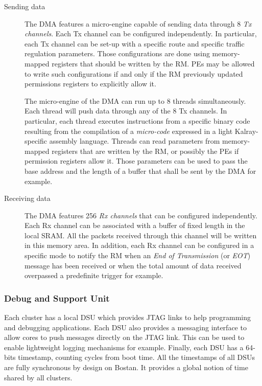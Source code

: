 \documentclass[main.tex]{subfiles}
\begin{document}
\begin{description}
    \item[Sending data]
        The DMA features a micro-engine capable of sending data through 8 \emph{Tx channels}. Each Tx channel can be configured independently. In particular, each Tx channel can be set-up with a specific route and specific traffic regulation parameters. Those configurations are done using memory-mapped registers that should be written by the RM. PEs may be allowed to write such configurations if and only if the RM previously updated permissions registers to explicitly allow it. 

        The micro-engine of the DMA can run up to 8 threads simultaneously. Each thread will push data through any of the 8 Tx channels. In particular, each thread executes instructions from a specific binary code resulting from the compilation of a \emph{micro-code} expressed in a light Kalray-specific assembly language. Threads can read parameters from memory-mapped registers that are written by the RM, or possibly the PEs if permission registers allow it. Those parameters can be used to pass the base address and the length of a buffer that shall be sent by the DMA for example.

    \item[Receiving data]
        The DMA features 256 \emph{Rx channels} that can be configured independently. Each Rx channel can be associated with a buffer of fixed length in the local SRAM. All the packets received through this channel will be written in this memory area. In addition, each Rx channel can be configured in a specific mode to notify the RM when an \emph{End of Transmission} (or \emph{EOT}) message has been received or when the total amount of data received overpassed a predefinite trigger for example.
\end{description}

\subsubsection{Debug and Support Unit}
Each cluster has a local DSU which provides JTAG links to help programming and debugging applications. Each DSU also provides a messaging interface to allow cores to push messages directly on the JTAG link. This can be used to enable lightweight logging mechanisms for example. Finally, each DSU has a 64-bits timestamp, counting cycles from boot time. All the timestamps of all DSUs are fully synchronous by design on Bostan. It provides a global notion of time shared by all clusters.
\end{document}
